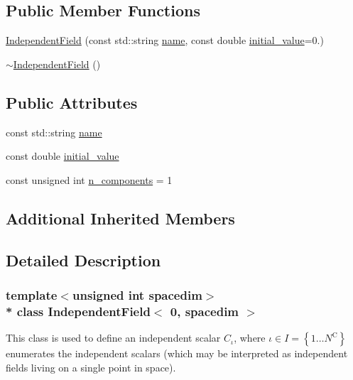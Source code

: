 \subsection*{Public Member Functions}
\begin{DoxyCompactItemize}
\item 
\hyperlink{class_independent_field_3_010_00_01spacedim_01_4_a8a486862088446941ea97fc471c5d44c}{Independent\+Field} (const std\+::string \hyperlink{class_independent_field_3_010_00_01spacedim_01_4_a05ecdcc8310253f055fbc59abaa2bc90}{name}, const double \hyperlink{class_independent_field_3_010_00_01spacedim_01_4_a8c4c434806dadc5b885102322e27357c}{initial\+\_\+value}=0.)
\item 
\hyperlink{class_independent_field_3_010_00_01spacedim_01_4_a653c01f2a6aeffba44542d9788433647}{$\sim$\+Independent\+Field} ()
\end{DoxyCompactItemize}
\subsection*{Public Attributes}
\begin{DoxyCompactItemize}
\item 
const std\+::string \hyperlink{class_independent_field_3_010_00_01spacedim_01_4_a05ecdcc8310253f055fbc59abaa2bc90}{name}
\item 
const double \hyperlink{class_independent_field_3_010_00_01spacedim_01_4_a8c4c434806dadc5b885102322e27357c}{initial\+\_\+value}
\item 
const unsigned int \hyperlink{class_independent_field_3_010_00_01spacedim_01_4_a248c2226570c71914f5219e7e3052561}{n\+\_\+components} = 1
\end{DoxyCompactItemize}
\subsection*{Additional Inherited Members}


\subsection{Detailed Description}
\subsubsection*{template$<$unsigned int spacedim$>$\\*
class Independent\+Field$<$ 0, spacedim $>$}

This class is used to define an independent scalar $C_\iota$, where $\iota \in I=\left\{1 \hdots N^\mathrm{C}\right\}$ enumerates the independent scalars (which may be interpreted as independent fields living on a single point in space). 

